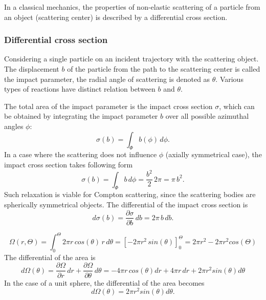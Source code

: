 \documentclass[a4paper,12pt,titlepage, twoside]{article}
\begin{document}

In a classical mechanics, the properties of non-elastic scattering of a particle from an object (scattering center) is described by a differential cross section.

\subsubsection{Differential cross section}

Considering a single particle on an incident trajectory with the scattering object.
The displacement $b$ of the particle from the path to the scattering center is called the impact parameter, the radial angle of scattering is denoted as $\theta$.
Various types of reactions have distinct relation between $b$ and $\theta$.

The total area of the impact parameter is the impact cross section $\sigma$, which can be obtained by integrating the impact parameter $b$ over all possible azimuthal angles $\phi$:
\begin{equation}
  \sigma\left(b\right) = \int_\Phi b\left(\phi\right)\,d\phi.
\end{equation}
In a case where the scattering does not influence $\phi$ (axially symmetrical case), the impact cross section takes following form
\begin{equation}
  \sigma\left(b\right) = \int_\Phi b\,d\phi = \frac{b^{2}}{2}\,2\pi = \pi\,b^2.
\end{equation}
Such relaxation is viable for Compton scattering, since the scattering bodies are spherically symmetrical objects.
The differential of the impact cross section is
\begin{equation}
  d\sigma\left(b\right) = \frac{\partial \sigma}{\partial b}\,db = 2\pi\,b\,db.
\end{equation}

\begin{equation}
  \Omega\left(r, \Theta\right) = \int_0^\Theta 2\pi r\,cos\left(\theta\right)\,r\,d\theta = \left[-2\pi r^2\,sin\left(\theta\right)\right]_0^\Theta = 2\pi r^2 - 2\pi r^2cos\left(\Theta\right)
\end{equation}
The differential of the area is
\begin{equation}
  d\Omega\left(\theta\right) = \frac{\partial \Omega}{\partial r}\,dr + \frac{\partial \Omega}{\partial \theta}\,d\theta = -4\pi r\,cos\left(\theta\right)dr + 4\pi r\,dr + 2\pi r^2sin\left(\theta\right)d\theta
\end{equation}
In the case of a unit sphere, the differential of the area becomes
\begin{equation}
  d\Omega(\theta) = 2\pi r^2sin\left(\theta\right)d\theta.
\end{equation}
\end{document}
